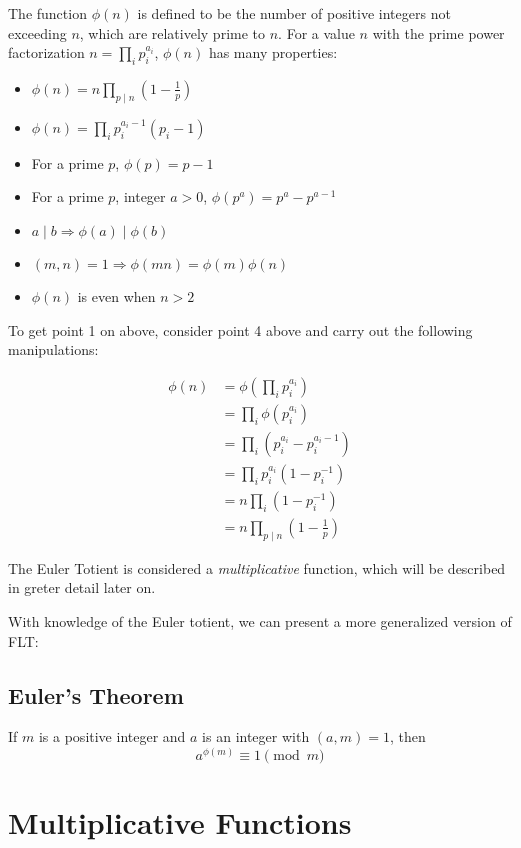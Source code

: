 \documentclass{article}
\begin{document}
\begin{multicols*}{2}
The function $\phi(n)$ is defined to be the number of positive integers not exceeding $n$, which are relatively prime to $n$. For a value $n$ with the prime power factorization $n = \prod_{i}p_i^{a_i}$, $\phi(n)$ has many properties:

\begin{itemize}
\item $\phi(n) = n \prod_{p \mid n} \left(1 - \frac{1}{p}\right)$
\item $\phi(n) = \prod_{i} p_i^{a_i - 1}(p_i - 1)$
\item For a prime $p$, $\phi(p) = p - 1$
\item For a prime $p$, integer $a > 0$, $\phi(p^a) = p^a - p^{a-1}$
\item $a \mid b \Rightarrow \phi(a) \mid \phi(b)$
\item $(m,n) = 1 \Rightarrow \phi(mn) = \phi(m)\phi(n)$
\item $\phi(n)$ is even when $n > 2$
\end{itemize}

To get point 1 on above, consider point 4 above and carry out the following manipulations:

\[
\begin{aligned}
\phi(n) &= \phi(\prod_{i}p_i^{a_i}) \\
&= \prod_i \phi(p_i^{a_i}) \\
&= \prod_i (p_i^{a_i} - p_i^{a_i - 1}) \\
&= \prod_i p_i^{a_i}( 1 - p_i^{-1}) \\
&= n \prod_i ( 1 - p_i^{-1}) \\
&= n \prod_{p \mid n} \left(1 - \frac{1}{p}\right)
\end{aligned}
\]

The Euler Totient is considered a \textit{multiplicative} function, which will be described in greter detail later on.

With knowledge of the Euler totient, we can present a more generalized version of FLT:

\subsection*{Euler's Theorem}

If $m$ is a positive integer and $a$ is an integer with $(a,m) = 1$, then \[a^{\phi(m)} \equiv 1 \pmod{m}\]

\section{Multiplicative Functions}


\end{multicols*}
\end{document}
